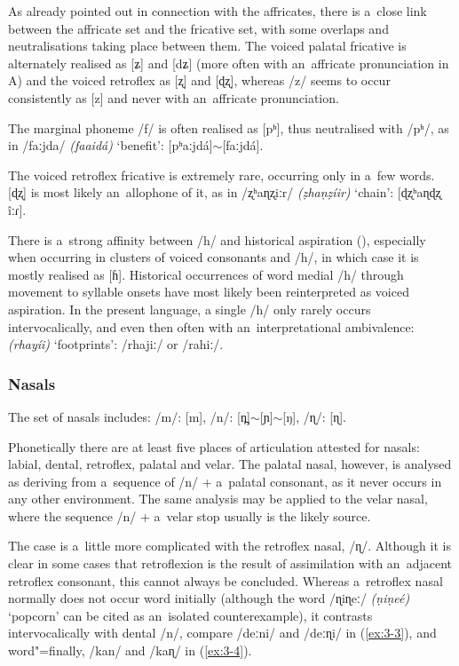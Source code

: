 As already pointed out in connection with the affricates, there is a~close link between the affricate set and the fricative set, with some overlaps and neutralisations taking place between them. The voiced palatal fricative is alternately realised as [ʑ] and [dʑ] (more often with an~affricate pronunciation in A) and the voiced retroflex as [ʐ] and [ɖʐ], whereas /z/ seems to occur consistently as [z] and never with an~affricate pronunciation.


The marginal phoneme /f/ is often realised as [pʰ], thus neutralised with /pʰ/, as in /faːjda/ \textit{(faaidá)} `benefit': [pʰaːjdá]$\sim$[faːjdá].


The voiced retroflex fricative is extremely rare, occurring only in a~few words. [ɖʐ] is most likely an~allophone of it, as in /ʐʰaɳʐiːr/ \textit{(ẓhaṇẓíir)} `chain': [ɖʐʰaɳɖʐ îːɾ]. 


There is a~strong affinity between /h/ and historical aspiration (), especially when occurring in clusters of voiced consonants and /h/, in which case it is mostly realised as [ɦ]. Historical occurrences of word medial /h/ through movement to syllable onsets have most likely been reinterpreted as voiced aspiration. In the present language, a single /h/ only rarely occurs intervocalically, and even then often with an~interpretational ambivalence: \textit{(rhayíi)} `footprints': /rhajiː/ or /rahiː/.


\subsubsection*{Nasals}

The set of nasals includes: /m/: [m], /n/: [n̪]$\sim${}[ɲ]$\sim$[ŋ], /ɳ/: [ɳ].


Phonetically there are at least five places of articulation attested for nasals: labial, dental, retroflex, palatal and velar. The palatal nasal, however, is analysed as deriving from a~sequence of /n/ + a~palatal consonant, as it never occurs in any other environment. The same analysis may be applied to the velar nasal, where the sequence /n/ + a~velar stop usually is the likely source.


The case is a~little more complicated with the retroflex nasal, /ɳ/. Although it is clear in some cases that retroflexion is the result of assimilation with an~adjacent retroflex consonant, this cannot always be concluded. Whereas a~retroflex nasal normally does not occur word initially (although the word /ɳiɳeː/ \textit{(ṇiṇeé)} `popcorn' can be cited as an~isolated counterexample), it contrasts intervocalically with dental /n/, compare /deːni/ and /deːɳi/ in (\ref{ex:3-3}), and word"=finally, /kan/ and /kaɳ/ in (\ref{ex:3-4}). 

